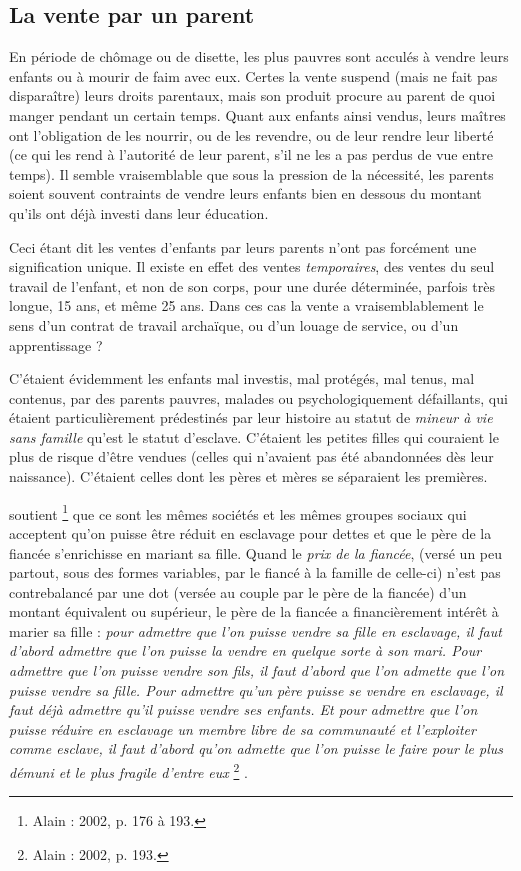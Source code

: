 \subsection{La vente par un parent}

\label{vente-parent}

En période de chômage ou de disette, les plus pauvres sont acculés
à vendre leurs enfants ou à mourir de faim avec eux. Certes la vente suspend
(mais ne fait pas disparaître) leurs droits parentaux, mais son produit
procure au parent de quoi manger pendant un certain temps. Quant
aux enfants ainsi vendus, leurs maîtres ont l'obligation de les nourrir, ou
de les revendre, ou de leur rendre leur liberté (ce qui les rend à l'autorité
de leur parent, s'il ne les a pas perdus de vue entre temps). Il semble vraisemblable
que sous la pression de la nécessité, les parents soient souvent
contraints de vendre leurs enfants bien en dessous du montant qu'ils ont
déjà investi dans leur éducation.

Ceci étant dit les ventes d'enfants par leurs parents n'ont pas forcément
une signification unique. Il existe en effet des ventes \emph{temporaires},
des ventes du seul travail de l'enfant, et non de son corps, pour une durée
déterminée, parfois très longue, 15 ans, et même 25 ans. Dans ces cas
la vente a vraisemblablement le sens d'un contrat de travail archaïque, ou
d'un louage de service, ou d'un apprentissage ?

C'étaient évidemment les enfants mal investis, mal protégés, mal
tenus, mal contenus, par des parents pauvres, malades ou psychologiquement
défaillants, qui étaient particulièrement prédestinés par leur histoire
au statut de \emph{mineur à vie sans famille} qu'est le statut d'esclave. C'étaient les
petites filles qui couraient le plus de risque d'être vendues (celles qui
n'avaient pas été abandonnées dès leur naissance). C'étaient celles dont
les pères et mères se séparaient les premières.

 soutient%
\footnote{Alain  : 2002, p. 176 à 193.} 
que ce sont les mêmes sociétés et les mêmes
groupes sociaux qui acceptent qu'on puisse être réduit en esclavage
pour dettes et que le père de la fiancée s'enrichisse en mariant sa fille.
Quand le \emph{prix de la fiancée}, (versé un peu partout, sous des formes variables,
par le fiancé à la famille de celle-ci) n'est pas contrebalancé par une
dot (versée au couple par le père de la fiancée) d'un montant équivalent
ou supérieur, le père de la fiancée a financièrement intérêt à marier sa fille :
{\emph{pour admettre que l'on puisse vendre sa fille en esclavage, il faut d'abord admettre
que l'on puisse la vendre en quelque sorte à son mari. Pour admettre que l'on puisse
vendre son fils, il faut d'abord que l'on admette que l'on puisse vendre sa fille. Pour
admettre qu'un père puisse se vendre en esclavage, il faut déjà admettre qu'il puisse
vendre ses enfants. Et pour admettre que l'on puisse réduire en esclavage un membre
libre de sa communauté et l'exploiter comme esclave, il faut d'abord qu'on admette que
l'on puisse le faire pour le plus démuni et le plus fragile d'entre eux}%
\footnote{Alain  : 2002, p. 193.}%
.}

